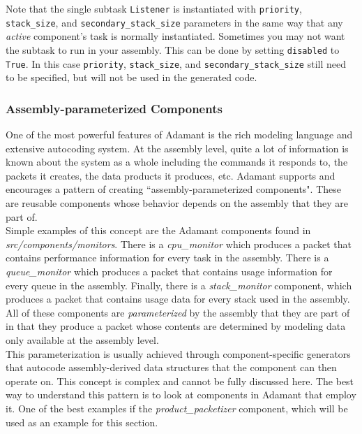 Note that the single subtask \texttt{Listener} is instantiated with \texttt{priority}, \texttt{stack\_size}, and \texttt{secondary\_stack\_size} parameters in the same way that any \textit{active} component's task is normally instantiated. Sometimes you may not want the subtask to run in your assembly. This can be done by setting \texttt{disabled} to \texttt{True}. In this case \texttt{priority}, \texttt{stack\_size}, and \texttt{secondary\_stack\_size} still need to be specified, but will not be used in the generated code.

\subsubsection{Assembly-parameterized Components}

One of the most powerful features of Adamant is the rich modeling language and extensive autocoding system. At the assembly level, quite a lot of information is known about the system as a whole including the commands it responds to, the packets it creates, the data products it produces, etc. Adamant supports and encourages a pattern of creating ``assembly-parameterized components". These are reusable components whose behavior depends on the assembly that they are part of. \\

Simple examples of this concept are the Adamant components found in \textit{src/components/monitors}. There is a \textit{cpu\_monitor} which produces a packet that contains performance information for every task in the assembly. There is a \textit{queue\_monitor} which produces a packet that contains usage information for every queue in the assembly. Finally, there is a \textit{stack\_monitor} component, which produces a packet that contains usage data for every stack used in the assembly. All of these components are \textit{parameterized} by the assembly that they are part of in that they produce a packet whose contents are determined by modeling data only available at the assembly level. \\

This parameterization is usually achieved through component-specific generators that autocode assembly-derived data structures that the component can then operate on. This concept is complex and cannot be fully discussed here. The best way to understand this pattern is to look at components in Adamant that employ it. One of the best examples if the \textit{product\_packetizer} component, which will be used as an example for this section. \\

